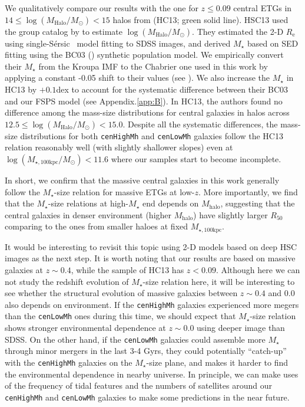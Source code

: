 \documentclass{emulateapj}
\def\ser{{S\'{e}rsic\ }}
\def\rbcg{\texttt{cenHighMh}}
\def\nbcg{\texttt{cenLowMh}}
\def\mstar{{$M_{\star}$}}
\def\mhalo{{$M_{\mathrm{halo}}$}}
\def\logmh{{$\log (M_{\mathrm{Halo}}/M_{\odot})$}}
\def\mtot{{$M_{\star,100\mathrm{kpc}}$}}
\def\logmtot{{$\log (M_{\star,100\mathrm{kpc}}/M_{\odot})$}}
\begin{document}
\begin{CJK*}{UTF8}{gbsn}
    We qualitatively compare our results with the one for $z\leq 0.09$ central ETGs in  
    $14\le$\logmh{}$<15$ halos from \citealt{HCompany13} (HC13; green solid line).
    HSC13 used the group catalog by \citet{Yang2007} to estimate \logmh{}. 
    They estimated the 2-D $R_{\mathrm{e}}$ using single-\ser{} model fitting to SDSS 
    images, and derived \mstar{} based on SED fitting using the BC03 (\citealt{BC03}) 
    synthetic population model.
    We empirically convert their \mstar{} from the Kroupa IMF to the Chabrier one 
    used in this work by applying a constant -0.05 shift to their values (see 
    \citealt{Bernardi2016}). 
    We also increase the \mstar{} in HC13 by $+0.1$dex to account for the systematic 
    difference between their BC03 and our FSPS model (see Appendix.\ref{app:B}). 
    In HC13, the authors found no difference among the mass-size distributions for 
    central galaxies in halos across $12.5\le$\logmh{}$<15.0$. 
    Despite all the systematic differences, the mass-size distributions for both \rbcg{} 
    and \nbcg{} galaxies follow the HC13 relation reasonably well (with slightly
    shallower slopes) even at \logmtot{}$< 11.6$ where our samples start to become 
    incomplete. 
    
    In short, we confirm that the massive central galaxies in this work generally 
    follow the \mstar{}-size relation for massive ETGs at low-$z$.
    More importantly, we find that the \mstar{}-size relations at high-\mstar{} end 
    depends on \mhalo{}, suggesting that the central galaxies in denser environment 
    (higher \mhalo{}) have slightly larger $R_{\mathrm{50}}$ comparing to the 
    ones from smaller haloes at fixed \mtot{}. 
    
    It would be interesting to revisit this topic using 2-D models based on deep HSC 
    images as the next step.
    It is worth noting that our results are based on massive galaxies at $z\sim 0.4$, 
    while the sample of HC13 has $z<0.09$.
    Although here we can not study the redshift evolution of \mstar{}-size relation 
    here, it will be interesting to see whether the structural evolution of massive
    galaxies between $z\sim 0.4$ and $0.0$ also depends on environment. 
    If the \rbcg{} galaxies experienced more megers than the \nbcg{} ones during this 
    time, we should expect that \mstar{}-size relation shows stronger environmental 
    dependence at $z\sim 0.0$ using deeper image than SDSS.
    On the other hand, if the \nbcg{} galaxies could assemble more \mstar{} through
    minor mergers in the last 3-4 Gyrs, they could potentially ``catch-up'' with the 
    \rbcg{} galaxies on the \mstar{}-size plane, and makes it harder to find the 
    environmental dependence in nearby universe.
    In principle, we can make uses of the frequency of tidal features and the numbers 
    of satellites around our \rbcg{} and \nbcg{} galaxies to make some predictions 
    in the near future.
    

\end{CJK*}
\end{document}
